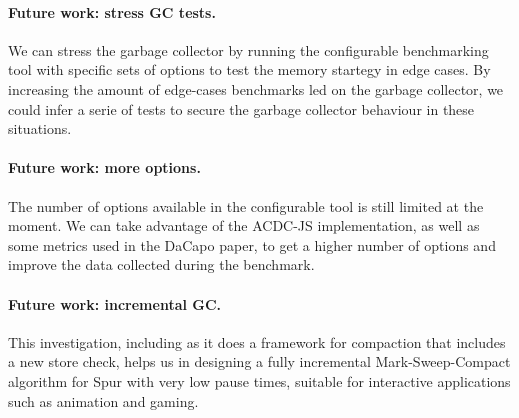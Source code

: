 \documentclass[10pt, sigplan]{acmart}
\begin{document}
\paragraph{Future work: stress GC tests.}
We can stress the garbage collector by running the configurable benchmarking tool with specific sets of options to test the memory startegy in edge cases. By increasing the amount of edge-cases benchmarks led on the garbage collector, we could infer a serie of tests to secure the garbage collector behaviour in these situations.

\paragraph{Future work: more options.}
The number of options available in the configurable tool is still limited at the moment. We can take advantage of the ACDC-JS implementation, as well as some metrics used in the DaCapo paper, to get a higher number of options and improve the data collected during the benchmark.

\paragraph{Future work: incremental GC.}
This investigation, including as it does a framework for compaction that includes a new store check, helps us in designing a fully incremental Mark-Sweep-Compact algorithm for Spur with very low pause times, suitable for interactive applications such as animation and gaming.
\newpage


\end{document}
